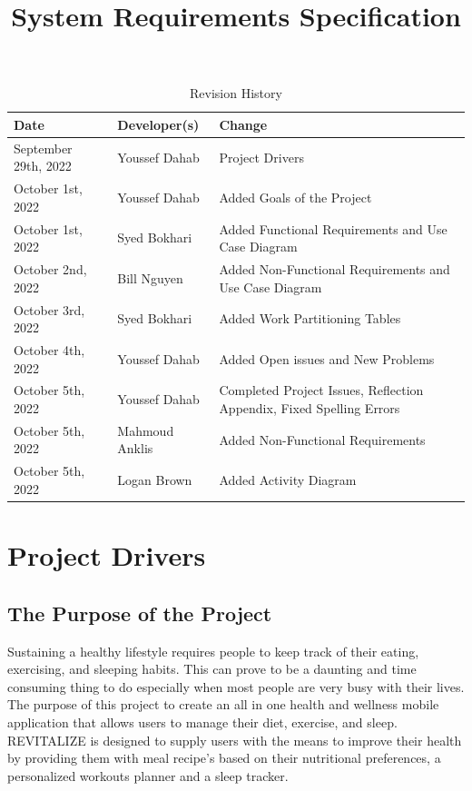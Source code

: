 \documentclass[12pt,letterpaper]{article}
\title{System Requirements Specification\\\progname}
\author{\authname}
\date{}
\begin{document}
\maketitle

\begin{table}[hp]
\caption{Revision History} \label{TblRevisionHistory}
\begin{tabularx}{\textwidth}{llX}
	\toprule
	\textbf{Date} & \textbf{Developer(s)} & \textbf{Change}\\
	\midrule
	September 29th, 2022 & Youssef Dahab & Project Drivers \\
	October 1st, 2022 & Youssef Dahab & Added Goals of the Project \\
	October 1st, 2022 & Syed Bokhari & Added Functional Requirements and Use Case Diagram \\
	October 2nd, 2022 & Bill Nguyen & Added Non-Functional Requirements and Use Case Diagram \\
	October 3rd, 2022 & Syed Bokhari & Added Work Partitioning Tables \\
	October 4th, 2022 & Youssef Dahab & Added Open issues and New Problems \\
	October 5th, 2022 & Youssef Dahab & Completed Project Issues, Reflection Appendix, Fixed Spelling Errors\\
	October 5th, 2022 & Mahmoud Anklis & Added Non-Functional Requirements\\
	October 5th, 2022 & Logan Brown & Added Activity Diagram\\
	\bottomrule
\end{tabularx}
\end{table}

\newpage
\tableofcontents
\newpage

\section{Project Drivers}

\subsection{The Purpose of the Project}
Sustaining a healthy lifestyle requires people to keep track of their eating, exercising, and sleeping habits. This can prove to be a daunting and time consuming thing to do especially when most people are very busy with their lives. The purpose of this project to create an all in one health and wellness mobile application that allows users to manage their diet, exercise, and sleep. REVITALIZE is designed to supply users with the means to improve their health by providing them with meal recipe's based on their nutritional preferences, a personalized workouts planner and a sleep tracker. 
\end{document}

